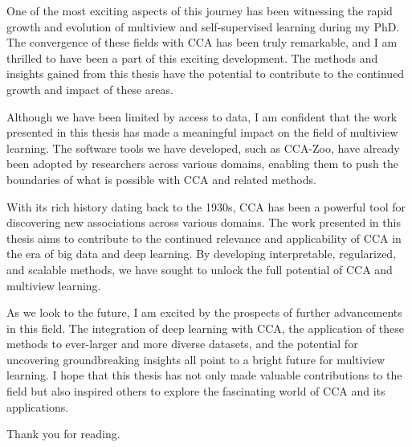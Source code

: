 One of the most exciting aspects of this journey has been witnessing the rapid growth and evolution of multiview and self-supervised learning during my PhD. The convergence of these fields with CCA has been truly remarkable, and I am thrilled to have been a part of this exciting development. The methods and insights gained from this thesis have the potential to contribute to the continued growth and impact of these areas.

Although we have been limited by access to data, I am confident that the work presented in this thesis has made a meaningful impact on the field of multiview learning. The software tools we have developed, such as CCA-Zoo, have already been adopted by researchers across various domains, enabling them to push the boundaries of what is possible with CCA and related methods.

With its rich history dating back to the 1930s, CCA has been a powerful tool for discovering new associations across various domains. The work presented in this thesis aims to contribute to the continued relevance and applicability of CCA in the era of big data and deep learning. By developing interpretable, regularized, and scalable methods, we have sought to unlock the full potential of CCA and multiview learning.

As we look to the future, I am excited by the prospects of further advancements in this field. The integration of deep learning with CCA, the application of these methods to ever-larger and more diverse datasets, and the potential for uncovering groundbreaking insights all point to a bright future for multiview learning. I hope that this thesis has not only made valuable contributions to the field but also inspired others to explore the fascinating world of CCA and its applications.

Thank you for reading.